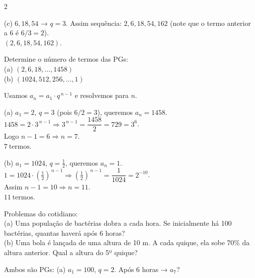 \documentclass[11pt]{article}
\begin{document}
\begin{multicols}{2}
\begin{enumerate}[leftmargin=*]
\begin{tcolorbox}[colback=green!10,colframe=green!60!black,title=\textbf{Solução da questão 8 },text width=0.9\columnwidth]
(c) $6,18,54$ → $q=3$. Assim sequência: $2,6,18,54,162$ (note que o termo anterior a 6 é $6/3=2$). \\
\(\boxed{(2,6,18,54,162)}\).
\end{tcolorbox}

\begin{tcolorbox}[colback=blue!8,colframe=blue!60!black,title=\textbf{Questão 9 },text width=0.9\columnwidth]
Determine o número de termos das PGs: \\
(a) $(2,6,18,\ldots,1458)$ \\ (b) $(1024,512,256,\ldots,1)$
\end{tcolorbox}

\begin{tcolorbox}[colback=green!10,colframe=green!60!black,title=\textbf{Solução da questão 9 },text width=0.9\columnwidth]
Usamos $a_n = a_1\cdot q^{\,n-1}$ e resolvemos para $n$.

(a) $a_1=2$, $q=3$ (pois $6/2=3$), queremos $a_n=1458$. \\
$1458 = 2\cdot 3^{\,n-1} \Rightarrow 3^{\,n-1} = \dfrac{1458}{2} = 729 = 3^{6}$. \\
Logo $n-1=6 \Rightarrow n=7$. \\
\(\boxed{7\ \text{termos}}\).

(b) $a_1=1024$, $q=\tfrac{1}{2}$, queremos $a_n=1$. \\
$1 = 1024\cdot \left(\tfrac{1}{2}\right)^{\,n-1} \Rightarrow \left(\tfrac{1}{2}\right)^{\,n-1} = \dfrac{1}{1024} = 2^{-10}$. \\
Assim $n-1=10 \Rightarrow n=11$. \\
\(\boxed{11\ \text{termos}}\).
\end{tcolorbox}

\begin{tcolorbox}[colback=blue!8,colframe=blue!60!black,title=\textbf{Questão 10 },text width=0.9\columnwidth]
Problemas do cotidiano: \\
(a) Uma população de bactérias dobra a cada hora. Se inicialmente há 100 bactérias, quantas haverá após 6 horas? \\

(b) Uma bola é lançada de uma altura de 10 m. A cada quique, ela sobe 70\% da altura anterior. Qual a altura do 5º quique?
\end{tcolorbox}

\begin{tcolorbox}[colback=green!10,colframe=green!60!black,title=\textbf{Solução da questão 10 },text width=0.85\columnwidth]
Ambos são PGs: (a) $a_1=100$, $q=2$. Após 6 horas → $a_7$? \\


\end{tcolorbox}
\end{enumerate}
\end{multicols}
\end{document}
